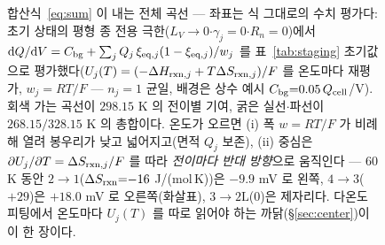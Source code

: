 \begin{figure}[t]
\caption{합산식~\eqref{eq:sum} 이 내는 전체 곡선 --- 좌표는 식 그대로의 수치 평가다: 초기 상태의 평형
종 전용 극한($L_V\!\to\!0$$\cdot$$\gamma_j{=}0$$\cdot$$R_n{=}0$)에서
$\mathrm{d} Q/\mathrm{d} V=C_{\mathrm{bg}}+\sum_jQ_j\,\xi_{\mathrm{eq},j}(1-\xi_{\mathrm{eq},j})/w_j$ 를 표~\ref{tab:staging} 초기값으로
평가했다($U_j(T)=(-\Delta H_{\mathrm{rxn},j}+T\Delta S_{\mathrm{rxn},j})/F$ 를 온도마다 재평가, $w_j{=}RT/F$
--- $n_j{=}1$ 균일, 배경은 상수 예시 $C_{\mathrm{bg}}{=}0.05\,Q_{\mathrm{cell}}$/V). 회색 가는 곡선이 $298.15$ K 의
전이별 기여, 굵은 실선$\cdot$파선이 $268.15/328.15$ K 의 총합이다. 온도가 오르면 (i) 폭
$w{=}RT/F$ 가 비례해 열려 봉우리가 낮고 넓어지고(면적 $Q_j$ 보존), (ii) 중심은
$\partial U_j/\partial T=\Delta S_{\mathrm{rxn},j}/F$ 를 따라 \emph{전이마다 반대 방향}으로 움직인다 ---
$60$ K 동안 $2\!\to\!1$($\Delta S_{\mathrm{rxn}}{=}{-}16$ J/(mol\,K))은 $-9.9$ mV 로 왼쪽,
$4\!\to\!3$($+29$)은 $+18.0$ mV 로 오른쪽(화살표), $3\!\to\!2\mathrm L$($0$)은 제자리다. 다온도
피팅에서 온도마다 $U_j(T)$ 를 따로 읽어야 하는 까닭(\S\ref{sec:center})이 이 한 장이다.}
\label{fig:cand-ff3-3}
\end{figure}
